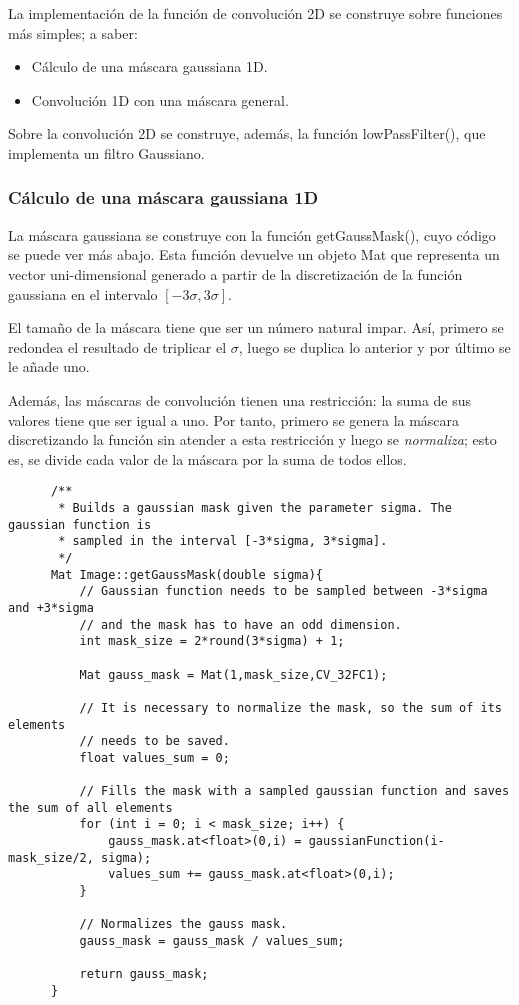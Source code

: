 \documentclass[a4paper, 11pt]{article}
\theoremstyle{definition}
\theoremstyle{theorem}
\begin{document}
  La implementación de la función de convolución 2D se construye sobre funciones más simples; a saber:
  \begin{itemize}
      \item Cálculo de una máscara gaussiana 1D.
      \item Convolución 1D con una máscara general.
  \end{itemize}

  Sobre la convolución 2D se construye, además, la función lowPassFilter(), que implementa un filtro Gaussiano.

  \subsubsection*{Cálculo de una máscara gaussiana 1D}
  La máscara gaussiana se construye con la función getGaussMask(), cuyo código se puede ver más abajo. Esta función devuelve un objeto Mat que representa un vector uni-dimensional generado a partir de la discretización de la función gaussiana en el intervalo $[-3\sigma, 3\sigma]$.

  El tamaño de la máscara tiene que ser un número natural impar. Así, primero se redondea el resultado de triplicar el $\sigma$, luego se duplica lo anterior y por último se le añade uno.

  Además, las máscaras de convolución tienen una restricción: la suma de sus valores tiene que ser igual a uno. Por tanto, primero se genera la máscara discretizando la función sin atender a esta restricción y luego se \emph{normaliza}; esto es, se divide cada valor de la máscara por la suma de todos ellos.

  \begin{lstlisting}
      /**
       * Builds a gaussian mask given the parameter sigma. The gaussian function is
       * sampled in the interval [-3*sigma, 3*sigma].
       */
      Mat Image::getGaussMask(double sigma){
          // Gaussian function needs to be sampled between -3*sigma and +3*sigma
          // and the mask has to have an odd dimension.
          int mask_size = 2*round(3*sigma) + 1;

          Mat gauss_mask = Mat(1,mask_size,CV_32FC1);

          // It is necessary to normalize the mask, so the sum of its elements
          // needs to be saved.
          float values_sum = 0;

          // Fills the mask with a sampled gaussian function and saves the sum of all elements
          for (int i = 0; i < mask_size; i++) {
              gauss_mask.at<float>(0,i) = gaussianFunction(i-mask_size/2, sigma);
              values_sum += gauss_mask.at<float>(0,i);
          }

          // Normalizes the gauss mask.
          gauss_mask = gauss_mask / values_sum;

          return gauss_mask;
      }
  \end{lstlisting}
\end{document}
